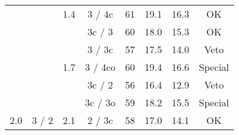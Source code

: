 \begin{tabular}{|c|c|c|c|c|c|c|c|}
 &  & \multirow{-3}{*}{1.4} & 3 / 4c & 61 & 19.1 & 16.3 & OK \\ \cline{3-8} 
 &  &  & 3c / 3 & 60 & 18.0 & 15.3 & OK \\ 
 &  &  & {\color[HTML]{009901} 3 / 3c} & {\color[HTML]{009901} 57} & {\color[HTML]{009901} 17.5} & {\color[HTML]{009901} 14.0} & {\color[HTML]{009901} Veto} \\
 &  & \multirow{-3}{*}{1.7} & {\color[HTML]{3166FF} 3 / 4co} & {\color[HTML]{3166FF} 60} & {\color[HTML]{3166FF} 19.4} & {\color[HTML]{3166FF} 16.6} & {\color[HTML]{3166FF} Special} \\ \cline{3-8} 
 &  &  & {\color[HTML]{009901} 3c / 2} & {\color[HTML]{009901} 56} & {\color[HTML]{009901} 16.4} & {\color[HTML]{009901} 12.9} & {\color[HTML]{009901} Veto} \\
 &  &  & {\color[HTML]{3166FF} 3c / 3o} & {\color[HTML]{3166FF} 59} & {\color[HTML]{3166FF} 18.2} & {\color[HTML]{3166FF} 15.5} & {\color[HTML]{3166FF} Special} \\ 
\multirow{-9}{*}{2.0} & \multirow{-9}{*}{3 / 2} & \multirow{-3}{*}{2.1} & 2 / 3c & 58 & 17.0 & 14.1 & OK \\ \hline
\end{tabular}